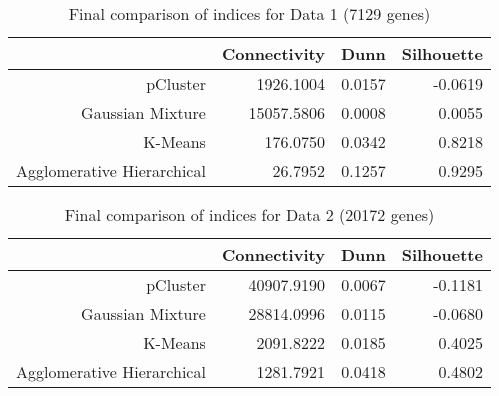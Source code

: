 \documentclass[11p]{article}
\begin{document}
\begin{table}[H]
\centering
\begin{tabular}{rrrr}
  \hline
 & Connectivity & Dunn & Silhouette \\
  \hline
pCluster & 1926.1004 & 0.0157 & -0.0619 \\
  Gaussian Mixture & 15057.5806 & 0.0008 & 0.0055 \\
  K-Means & 176.0750 & 0.0342 & 0.8218 \\
  Agglomerative Hierarchical & 26.7952 & 0.1257 & 0.9295 \\
   \hline
\end{tabular}
\caption{Final comparison of indices for Data 1 (7129 genes)}
\end{table}

\begin{table}[ht]
\centering
\begin{tabular}{rrrr}
  \hline
 & Connectivity & Dunn & Silhouette \\
  \hline
pCluster & 40907.9190 & 0.0067 & -0.1181 \\
  Gaussian Mixture & 28814.0996 & 0.0115 & -0.0680 \\
  K-Means & 2091.8222 & 0.0185 & 0.4025 \\
  Agglomerative Hierarchical & 1281.7921 & 0.0418 & 0.4802 \\
 \hline
\end{tabular}
\caption{Final comparison of indices for Data 2 (20172 genes)}
\end{table}
\end{document}
